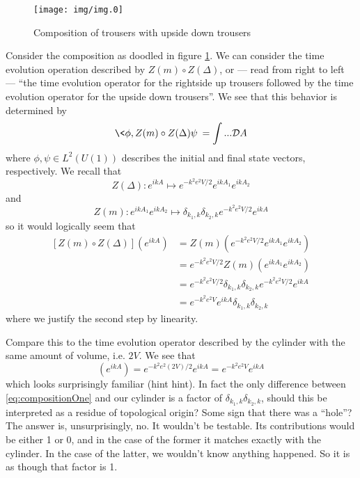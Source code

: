 
\begin{figure}[ht]
\texttt{[image: img/img.0]}
\caption{Composition of trousers with upside down trousers}\label{fig:img0}
\end{figure}

Consider the composition as doodled in figure \ref{fig:img0}. We
can consider the time evolution operation described by
$Z(m)\circ{Z(\Delta)}$, or --- read from right to left --- ``the
time evolution operator for the rightside up trousers followed by
the time evolution operator for the upside down trousers''. We
see that this behavior is determined by
\begin{equation}%
\<\phi,Z(m)\circ{Z(\Delta)}\psi\> = \int ... \mathcal{D}A
\end{equation}
where $\phi,\psi\in L^{2}(U(1))$ describes the initial and final
state vectors, respectively. We recall that
\begin{equation}%
Z(\Delta):e^{ikA}\mapsto e^{-k^{2}e^{2}V/2}e^{ikA_{1}}e^{ikA_{2}}
\end{equation}
and
\begin{equation}%
Z(m):e^{ikA_{1}}e^{ikA_{2}}\mapsto \delta_{k_{1},k}\delta_{k_{2},k}e^{-k^{2}e^{2}V/2}e^{ikA}
\end{equation}
so it would logically seem that
\begin{subequations}
\begin{align}
[Z(m)\circ Z(\Delta)](e^{ikA}) &= Z(m)\left(e^{-k^{2}e^{2}V/2}e^{ikA_{1}}e^{ikA_{2}}\right)\\
&= e^{-k^{2}e^{2}V/2}Z(m)\left(e^{ikA_{1}}e^{ikA_{2}}\right)\\
&= e^{-k^{2}e^{2}V/2}\delta_{k_{1},k}\delta_{k_{2},k}e^{-k^{2}e^{2}V/2}e^{ikA}\\
&= e^{-k^{2}e^{2}V}e^{ikA}\delta_{k_{1},k}\delta_{k_{2},k} \label{eq:compositionOne}
\end{align}
\end{subequations}
where we justify the second step by linearity.

Compare this to the time evolution operator described by the
cylinder with the same amount of volume, i.e. $2V$. We see that
\begin{equation}%
[Z(C)]\left(e^{ikA}\right) = e^{-k^{2}e^{2}(2V)/2}e^{ikA} = e^{-k^{2}e^{2}V}e^{ikA}
\end{equation}
which looks surprisingly familiar (hint hint). In fact the only
difference between \eqref{eq:compositionOne} and our cylinder is
a factor of $\delta_{k_{1},k}\delta_{k_{2},k}$, should this be
interpreted as a residue of topological origin? Some sign that
there was a ``hole''? The answer is, unsurprisingly, no. It
wouldn't be testable. Its contributions would be either 1 or 0,
and in the case of the former it matches exactly with the
cylinder. In the case of the latter, we wouldn't know anything
happened. So it is as though that factor is 1.
